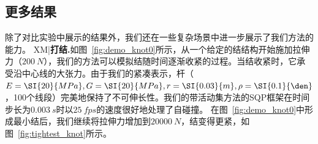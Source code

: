 \subsection{更多结果}
除了对比实验中展示的结果外，我们还在一些复杂场景中进一步展示了我们方法的能力。
XM|\textbf{打结.}如图~\ref{fig:demo_knot0}所示，从一个给定的结结构开始施加拉伸力（$\SI{200}{N}$），我们的方法可以模拟结随时间逐渐收紧的过程。当结收紧时，它承受沿中心线的大张力。由于我们的紧凑表示，杆（$E = \SI{20}{MPa}, G = \SI{20}{MPa}, r = \SI{0.03}{m}, \rho = \SI{0.1}{\den}$，100个线段）完美地保持了不可伸长性。我们的带活动集方法的SQP框架在时间步长为$\SI{0.003}{s}$时以$\SI{25}{fps}$的速度很好地处理了自碰撞。
  在图~\ref{fig:demo_knot0}中形成最小结后，我们继续将拉伸力增加到$\SI{20000}{N}$，结变得更紧，如图~\ref{fig:tightest_knot}所示。

